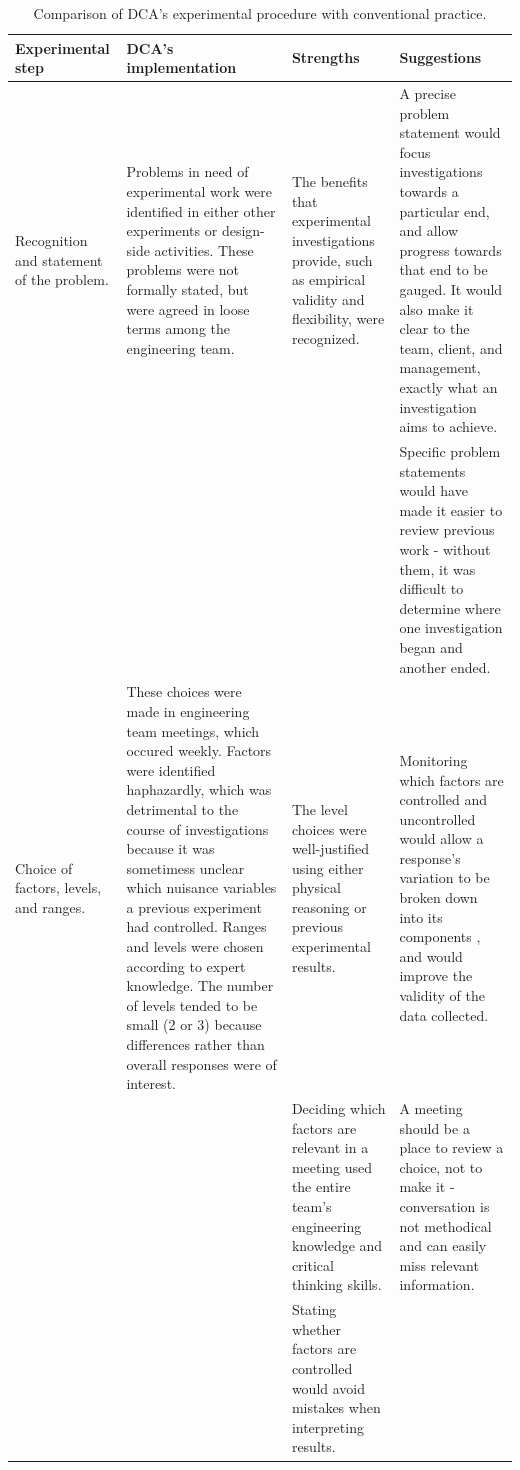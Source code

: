 \documentclass[11pt,a4paper,article]{memoir} %
\begin{document}
\begin{landscape}
\vspace*{-3cm}
{\tiny
\begin{longtable}{p{4cm} p{7cm} p{6cm} p{6cm}}
\caption{Comparison of DCA's experimental procedure with conventional practice.}\\
\toprule[0.15em]
\textbf{Experimental step} & \textbf{DCA's implementation} & \textbf{Strengths} & \textbf{Suggestions} \\
\toprule[0.15em]
Recognition and statement of the problem. & Problems in need of experimental work were identified in either other experiments or design-side activities. These problems were not formally stated, but were agreed in loose terms among the engineering team. & The benefits that experimental investigations provide, such as empirical validity and flexibility, were recognized. & A precise problem statement would focus investigations towards a particular end, and allow progress towards that end to be gauged. It would also make it clear to the team, client, and management, exactly what an investigation aims to achieve. \\ 
 &  &  & Specific problem statements would have made it easier to review previous work - without them, it was difficult to determine where one investigation began and another ended. \\ 
\cmidrule{1-4}
Choice of factors, levels, and ranges. & These choices were made in engineering team meetings, which occured weekly. Factors were identified haphazardly, which was detrimental to the course of investigations because it was sometimess unclear which nuisance variables a previous experiment had controlled. Ranges and levels were chosen according to expert knowledge. The number of levels tended to be small (2 or 3) because differences rather than overall responses were of interest. & The level choices were well-justified using either physical reasoning or previous experimental results. & Monitoring which factors are controlled and uncontrolled would allow a response's variation to be broken down into its components , and would improve the validity of the data collected.\\ 
 &  & Deciding which factors are relevant in a meeting used the entire team's engineering knowledge and critical thinking skills. & A meeting should be a place to review a choice, not to make it - conversation is not methodical and can easily miss relevant information.\\
 & & Stating whether factors are controlled would avoid mistakes when interpreting results. \\ 

\end{longtable}}
\end{landscape}
\end{document}
